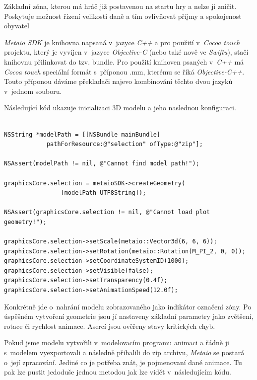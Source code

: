 \documentclass[twoside,12pt]{article}
\begin{document}
Základní zóna, kterou má hráč již postavenou na startu hry a nelze ji zničit. Poskytuje možnost řízení velikosti daně a tím ovlivňovat příjmy a spokojenost obyvatel

\textit{Metaio SDK} je knihovna napsaná v~jazyce \textit{C++} a pro použití v~\textit{Cocoa touch} projektu, který je vyvíjen v~jazyce \textit{Objective-C} (nebo také nově ve \textit{Swiftu}), stačí knihovnu přilinkovat do tzv. bundle. Pro použití knihoven psaných v~\textit{C++} má \textit{Cocoa touch} speciální formát s~příponou .mm, kterému se říká \textit{Objective-C++}. Touto příponou dáváme překladači najevo kombinování těchto dvou jazyků v~jednom souboru. 

Následující kód ukazuje inicializaci 3D modelu a jeho naslednou konfiguraci.

\begin{verbatim}

NSString *modelPath = [[NSBundle mainBundle] 
			pathForResource:@"selection" ofType:@"zip"];
    
NSAssert(modelPath != nil, @"Cannot find model path!");
    
graphicsCore.selection = metaioSDK->createGeometry(
				[modelPath UTF8String]);
    
NSAssert(graphicsCore.selection != nil, @"Cannot load plot geometry!");
        
graphicsCore.selection->setScale(metaio::Vector3d(6, 6, 6));
graphicsCore.selection->setRotation(metaio::Rotation(M_PI_2, 0, 0));
graphicsCore.selection->setCoordinateSystemID(1000);
graphicsCore.selection->setVisible(false);
graphicsCore.selection->setTransparency(0.4f);
graphicsCore.selection->setAnimationSpeed(12.0f);

\end{verbatim}

Konkrétně jde o~nahrání modelu zobrazovaného jako indikátor označení zóny. Po úspěšném vytvoření geometrie jsou jí nastaveny základní parametry jako zvětšení, rotace či rychlost animace. Asercí jsou ověřeny stavy kritických chyb. 

Pokud jsme modelu vytvořili v~modelovacím programu animaci a řádně ji s~modelem vyexportovali a následně přibalili do zip archivu, \textit{Metaio} se postará o~její zpracování. Jediné co je potřeba znát, je pojmenovaní dané animace. Tu pak lze pustit jedoduše jednou metodou jak lze vidět v~následujícím kódu.
\end{document}
